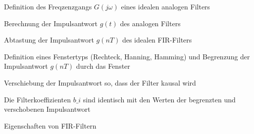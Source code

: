 \documentclass[a4paper]{article}
\begin{document}
\begin{multicols}{3}
  \begin{enumerate*}
    \def\labelenumi{\arabic{enumi}.}
    \item Definition des Freqzenzgangs $G(j\omega)$ eines idealen analogen Filters
    \item Berechnung der Impulsantwort $g(t)$ des analogen Filters
    \item Abtastung der Impulsantwort $g(nT)$ des idealen FIR-Filters
    \item Definition eines Fenstertyps (Rechteck, Hanning, Hamming) und Begrenzung der Impulsantwort $g(nT)$ durch das Fenster
    \item Verschiebung der Impulsantwort so, dass der Filter kausal wird
    \item Die Filterkoeffizienten $b\_i$ sind identisch mit den Werten der begrenzten und verschobenen Impulsantwort
  \end{enumerate*}

  Eigenschaften von FIR-Filtern


\end{multicols}
\end{document}
